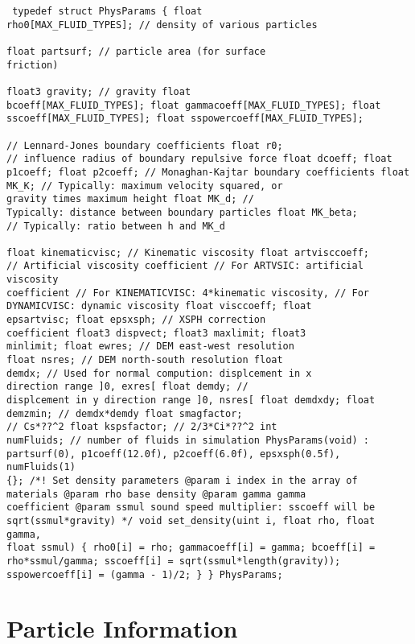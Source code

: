 \documentclass[12pt]{memoir}
\begin{document}
\begin{verbatim} typedef struct PhysParams { float
rho0[MAX_FLUID_TYPES]; // density of various particles

float partsurf; // particle area (for surface
friction)

float3 gravity; // gravity float
bcoeff[MAX_FLUID_TYPES]; float gammacoeff[MAX_FLUID_TYPES]; float
sscoeff[MAX_FLUID_TYPES]; float sspowercoeff[MAX_FLUID_TYPES];

// Lennard-Jones boundary coefficients float r0;
// influence radius of boundary repulsive force float dcoeff; float
p1coeff; float p2coeff; // Monaghan-Kajtar boundary coefficients float
MK_K; // Typically: maximum velocity squared, or
gravity times maximum height float MK_d; //
Typically: distance between boundary particles float MK_beta;
// Typically: ratio between h and MK_d

float kinematicvisc; // Kinematic viscosity float artvisccoeff;
// Artificial viscosity coefficient // For ARTVSIC: artificial viscosity
coefficient // For KINEMATICVISC: 4*kinematic viscosity, // For
DYNAMICVISC: dynamic viscosity float visccoeff; float
epsartvisc; float epsxsph; // XSPH correction
coefficient float3 dispvect; float3 maxlimit; float3
minlimit; float ewres; // DEM east-west resolution
float nsres; // DEM north-south resolution float
demdx; // Used for normal compution: displcement in x
direction range ]0, exres[ float demdy; //
displcement in y direction range ]0, nsres[ float demdxdy; float
demzmin; // demdx*demdy float smagfactor;
// Cs*??^2 float kspsfactor; // 2/3*Ci*??^2 int
numFluids; // number of fluids in simulation PhysParams(void) :
partsurf(0), p1coeff(12.0f), p2coeff(6.0f), epsxsph(0.5f), numFluids(1)
{}; /*! Set density parameters @param i index in the array of
materials @param rho base density @param gamma gamma
coefficient @param ssmul sound speed multiplier: sscoeff will be
sqrt(ssmul*gravity) */ void set_density(uint i, float rho, float gamma,
float ssmul) { rho0[i] = rho; gammacoeff[i] = gamma; bcoeff[i] =
rho*ssmul/gamma; sscoeff[i] = sqrt(ssmul*length(gravity));
sspowercoeff[i] = (gamma - 1)/2; } } PhysParams;

\end{verbatim}


\section{Particle Information}
\end{document}
